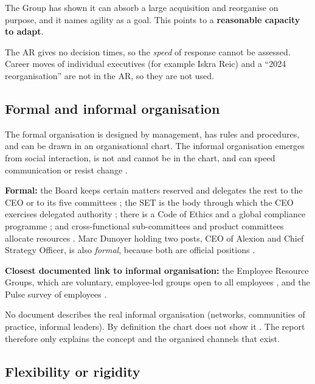 \begin{analysis}
The Group has shown it can absorb a large acquisition and reorganise on purpose, and it names agility as a goal. This points to a \textbf{reasonable capacity to adapt}.
\end{analysis}

\begin{sourceslimit}
The AR gives no decision times, so the \textit{speed} of response cannot be assessed. Career moves of individual executives (for example Iskra Reic) and a ``2024 reorganisation'' are not in the AR, so they are not used.
\end{sourceslimit}

\subsection{Formal and informal organisation}

The formal organisation is designed by management, has rules and procedures, and can be drawn in an organisational chart. The informal organisation emerges from social interaction, is not and cannot be in the chart, and can speed communication or resist change \cite[pp.~12--13]{ORG}.

\textbf{Formal:} the Board keeps certain matters reserved and delegates the rest to the CEO or to its five committees \cite[p.~67]{AR}; the SET is the body through which the CEO exercises delegated authority \cite[p.~70]{AR}; there is a Code of Ethics and a global compliance programme \cite[p.~34]{AR}; and cross-functional sub-committees and product committees allocate resources \cite[p.~147]{AR}. Marc Dunoyer holding two posts, CEO of Alexion and Chief Strategy Officer, is also \textit{formal}, because both are official positions \cite[p.~70]{AR}.

\textbf{Closest documented link to informal organisation:} the Employee Resource Groups, which are voluntary, employee-led groups open to all employees \cite[p.~39]{AR}, and the Pulse survey of employees \cite[p.~39]{AR}.

\begin{sourceslimit}
No document describes the real informal organisation (networks, communities of practice, informal leaders). By definition the chart does not show it \cite[p.~12]{ORG}. The report therefore only explains the concept and the organised channels that exist.
\end{sourceslimit}

\subsection{Flexibility or rigidity}

